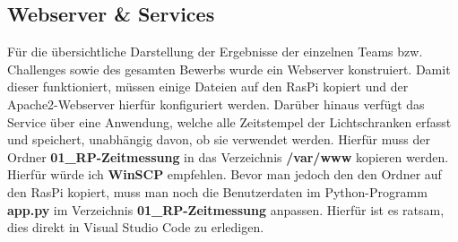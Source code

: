 \begin{comment}
	Danach müssen wir noch die Service-Datei in den richtigen Ordner verschieben.
	\begin{Textfeld1}
		sudo mv /home/admin/01\_RP-Zeitmessung/webserver.service /etc/systemd/system
	\end{Textfeld1}
	
	Anschließend müssen wir noch Ausführungsrechte rekursiv für das gesamte Verzeichnis erteilen:
	\begin{Textfeld1}
		chmod -R +x /home/admin/01\_RP-Zeitmessung
	\end{Textfeld1}
	
	Nachher laden wir mit dem folgenden Befehl den Systemd-Deamon neu :
	\begin{Textfeld1}
		sudo systemctl daemon-reload
	\end{Textfeld1}
	
	Als Nächstes starten wir das Service und aktivieren den automatischen Start bei Systemstart:
	\begin{Textfeld1}
		sudo systemctl start webserver \\
		sudo systemctl enable webserver
	\end{Textfeld1}
	
	Somit wurde der Webserver erfolgreich aktiviert. Man kann nun auf die Anwendung zugreifen, indem man die IP-Adresse des \ac{RasPi} und die Erweiterung '':5000'' in seinem Webbrowser eingibt. Zum Beispiel: \textbf{''192.168.0.x:5000''}.
\end{comment}


\subsection{Webserver \& Services}
Für die übersichtliche Darstellung der Ergebnisse der einzelnen Teams bzw. Challenges sowie des gesamten Bewerbs wurde ein Webserver konstruiert. Damit dieser funktioniert, müssen einige Dateien auf den \ac{RasPi} kopiert und der Apache2-Webserver hierfür konfiguriert werden. Darüber hinaus verfügt das Service über eine Anwendung, welche alle Zeitstempel der Lichtschranken erfasst und speichert, unabhängig davon, ob sie verwendet werden. Hierfür muss der Ordner \textbf{01\_RP-Zeitmessung} in das Verzeichnis \textbf{/var/www} kopieren werden. Hierfür würde ich \textbf{WinSCP} empfehlen. Bevor man jedoch den den Ordner auf den \ac{RasPi} kopiert, muss man noch die Benutzerdaten im Python-Programm \textbf{app.py} im Verzeichnis \textbf{01\_RP-Zeitmessung} anpassen. 
\newpage
Hierfür ist es ratsam, dies direkt in Visual Studio Code zu erledigen.

